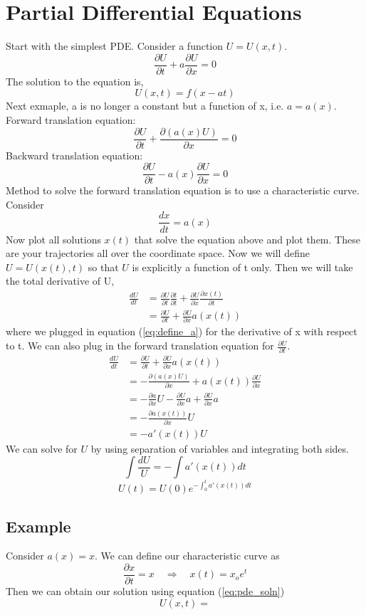 \documentclass{article}
\newcommand{\be}{\begin{equation}}
\newcommand{\ee}{\end{equation}}
\begin{document}
\section{Partial Differential Equations}
Start with the simplest PDE.
Consider a function $U = U(x,t)$.
\be
  \frac{\partial U}{\partial t} + a \frac{\partial U}{\partial x} = 0
\ee
The solution to the equation is,
\be
  U(x,t) = f(x - at)
\ee
Next exmaple, a is no longer a constant but a function of x, i.e. $a = a(x)$.
Forward translation equation:
\be
  \frac{\partial U}{\partial t} + \frac{\partial (a(x) U)}{\partial x} = 0
\ee
Backward translation equation:
\be
    \frac{\partial U}{\partial t} - a(x) \frac{\partial U}{\partial x} = 0
\ee
Method to solve the forward translation equation is to use a characteristic curve.
Consider
\be \label{eq:define_a}
  \frac{dx}{dt} = a(x)
\ee
Now plot all solutions $x(t)$ that solve the equation above and plot them.
These are your trajectories all over the coordinate space.
Now we will define $U = U(x(t),t)$ so that $U$ is explicitly a function of t only.
Then we will take the total derivative of U,
\be
  \begin{split}
    \frac{d U}{d t} &= \frac{\partial U}{\partial t} \frac{\partial t}{\partial t} + \frac{\partial U}{\partial x} \frac{\partial x(t)}{\partial t} \\
    &= \frac{\partial U}{\partial t} + \frac{\partial U}{\partial x} a(x(t))
  \end{split}
\ee
where we plugged in equation (\ref{eq:define_a}) for the derivative of x with respect to t.
We can also plug in the forward translation equation for $\frac{\partial U}{\partial t}$.
\be
  \begin{split}
    \frac{d U}{d t} &= \frac{\partial U}{\partial t} + \frac{\partial U}{\partial x} a(x(t)) \\
    &= - \frac{\partial (a(x) U)}{\partial x} + a(x(t)) \frac{\partial U}{\partial x} \\
    &= - \frac{\partial a}{\partial x} U - \frac{\partial U}{\partial x} a + \frac{\partial U}{\partial x} a \\
    &= - \frac{\partial a(x(t))}{\partial x} U \\
    &= - a'(x(t)) U
  \end{split}
\ee
We can solve for $U$ by using separation of variables and integrating both sides.
\be
  \int \frac{d U}{U} = - \int a'(x(t)) dt
\ee
\be \label{eq:pde_soln}
  U(t) = U(0) e^{- \int_0^t a'(x(t)) dt}
\ee
\subsection{Example}
Consider $a(x) = x$.
We can define our characteristic curve as
\be
  \frac{\partial x}{\partial t} = x \quad \Longrightarrow \quad x(t) = x_o e^t
\ee
Then we can obtain our solution using equation (\ref{eq:pde_soln})
\be
  U(x,t) =
\ee
\end{document}

